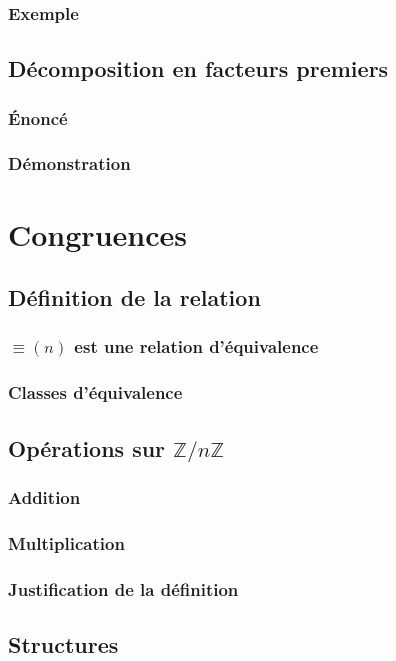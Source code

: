 \documentclass[12pt,a4paper,french]{book}
\begin{document}
			\subsubsection{Exemple}
		\subsection{Décomposition en facteurs premiers}
			\subsubsection{Énoncé}
			\subsubsection{Démonstration}
	\section{Congruences}
		\subsection{Définition de la relation}
			\subsubsection{$\equiv (n)$ est une relation d'équivalence}
			\subsubsection{Classes d'équivalence}
		\subsection{Opérations sur $\mathbb{Z}/ n\mathbb{Z}$}
			\subsubsection{Addition}
			\subsubsection{Multiplication}
			\subsubsection{Justification de la définition}
		\subsection{Structures}
		
\end{document}
